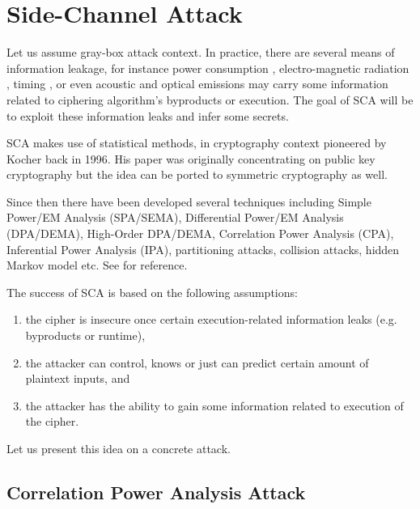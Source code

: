 \section{Side-Channel Attack}
\label{sec:side}

Let us assume gray-box attack context. In practice, there are several means of information leakage, for instance power consumption \cite{kocher1999differential}, electro-magnetic radiation \cite{agrawal2002side,gandolfi2001electromagnetic,quisquater2001electromagnetic}, timing \cite{kocher1996timing}, or even acoustic \cite{asonov2004keyboard} and optical \cite{kuhn2002optical,loughry2002information} emissions may carry some information related to ciphering algorithm's byproducts or execution. The goal of SCA will be to exploit these information leaks and infer some secrets.

SCA makes use of statistical methods, in cryptography context pioneered by Kocher \cite{kocher1996timing} back in 1996. His paper was originally concentrating on public key cryptography but the idea can be ported to symmetric cryptography as well.

Since then there have been developed several techniques including Simple Power/EM Analysis (SPA/SEMA), Differential Power/EM Analysis (DPA/DEMA), High-Order DPA/DEMA, Correlation Power Analysis (CPA), Inferential Power Analysis (IPA), partitioning attacks, collision attacks, hidden Markov model etc. See \cite[Chapters~13-14]{koc2008cryptographic} for reference.

The success of SCA is based on the following assumptions:
\begin{enumerate}
	\item the cipher is insecure once certain execution-related information leaks (e.g. byproducts or runtime),
	\item the attacker can control, knows or just can predict certain amount of plaintext inputs, and
	\item the attacker has the ability to gain some information related to execution of the cipher.
\end{enumerate}
Let us present this idea on a concrete attack.



\subsection{Correlation Power Analysis Attack}

